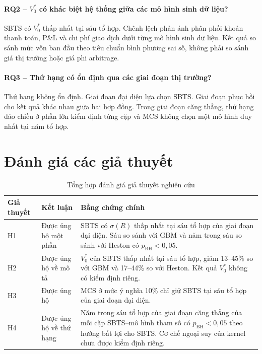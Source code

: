 \paragraph{RQ2 -- $V_0^{*}$ có khác biệt hệ thống giữa các mô hình sinh dữ liệu?}
SBTS có $V_0^{*}$ thấp nhất tại sáu tổ hợp. Chênh lệch phản ánh phân phối khoản
thanh toán, P\&L và chi phí giao dịch dưới từng mô hình sinh dữ liệu. Kết quả
so sánh mức vốn ban đầu theo tiêu chuẩn bình phương sai số, không phải so sánh giá
thị trường hoặc giá phi arbitrage.

\paragraph{RQ3 -- Thứ hạng có ổn định qua các giai đoạn thị trường?}
Thứ hạng không ổn định. Giai đoạn đại diện lựa chọn SBTS. Giai đoạn phục hồi
cho kết quả khác nhau giữa hai hợp đồng. Trong giai đoạn căng thẳng, thứ hạng
đảo chiều ở phần lớn kiểm định từng cặp và MCS không chọn một mô hình duy nhất
tại năm tổ hợp.

\section{Đánh giá các giả thuyết}
\label{sec:c5-hypotheses}

\begin{table}[H]
\centering
\small
\caption{Tổng hợp đánh giá giả thuyết nghiên cứu}
\label{tab:c5-hypotheses}
\begin{tabularx}{\textwidth}{@{}
>{\raggedright\arraybackslash}p{}
>{\raggedright\arraybackslash}p{}
X@{}}
\toprule
\textbf{Giả thuyết} & \textbf{Kết luận} & \textbf{Bằng chứng chính}\\
\midrule
H1 & Được ủng hộ một phần & SBTS có $\sigma(R)$ thấp nhất tại sáu tổ hợp của giai đoạn
đại diện. Sáu so sánh với GBM và năm trong sáu so sánh với Heston có
$p_{\mathrm{BH}}<0{,}05$.\\
H2 & Được ủng hộ về mô tả & $V_0^{*}$ của SBTS thấp nhất tại sáu tổ hợp, giảm
13--45\% so với GBM và 17--44\% so với Heston. Kết quả $V_0^{*}$ không có kiểm
định riêng.\\
H3 & Được ủng hộ & MCS ở mức ý nghĩa 10\% chỉ giữ SBTS tại sáu tổ hợp của giai đoạn đại diện.\\
H4 & Được ủng hộ về thứ hạng & Năm trong sáu tổ hợp của giai đoạn căng thẳng của mỗi cặp
SBTS--mô hình tham số có $p_{\mathrm{BH}}<0{,}05$ theo hướng bất lợi cho SBTS.
Cơ chế ngoại suy của kernel chưa được kiểm định riêng.\\
\bottomrule
\end{tabularx}
\end{table}

